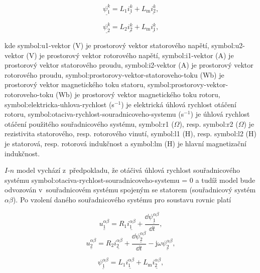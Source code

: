 \documentclass[a4paper, twoside, 11pt]{article}
\begin{document}
		\begin{equation}
			\underline{\psi_1^{k}} = L_1 \underline{i_1^{k}} + L_\text{m} \underline{i_2^{k}},
		\end{equation}
	
		\begin{equation}
			\underline{\psi_2^{k}} = L_2 \underline{i_2^{k}} + L_\text{m} \underline{i_1^{k}},
		\end{equation}

		kde \gls{symbol:u1-vektor} (V) je prostorový vektor statorového napětí, \gls{symbol:u2-vektor} (V) je prostorový vektor rotorového napětí, \gls{symbol:i1-vektor} (A) je prostorový vektor statorového proudu, \gls{symbol:i2-vektor} (A) je prostorový vektor rotorového proudu, \gls{symbol:prostorovy-vektor-statoroveho-toku} (Wb) je prostorový vektor magnetického toku statoru, \gls{symbol:prostorovy-vektor-rotoroveho-toku} (Wb) je prostorový vektor magnetického toku rotoru, \gls{symbol:elektricka-uhlova-rychlost} (s$^{-1}$) je elektrická úhlová rychlost otáčení rotoru, \gls{symbol:otaciva-rychlost-souradnicoveho-systemu} (s$^{-1}$) je úhlová rychlost otáčení použitého souřadnicového systému, \gls{symbol:r1} ($\Omega$), resp. \gls{symbol:r2} ($\Omega$) je rezistivita statorového, resp. rotorového vinutí, \gls{symbol:l1} (H), resp. \gls{symbol:l2} (H) je statorová, resp. rotorová indukčnost a \gls{symbol:lm} (H) je hlavní magnetizační indukčnost.\par
		$I$-$n$ model vychází z~předpokladu, že otáčivá úhlová rychlost souřadnicového systému \gls{symbol:otaciva-rychlost-souradnicoveho-systemu} = 0 a tudíž model bude odvozován v~souřadnicovém systému spojeným se statorem (souřadnicový systém $\alpha \beta$). Po vzolení daného souřadnicového systému pro soustavu rovnic platí

		\begin{equation}
			\underline{u_{1}^{\alpha \beta}} = R_1 \underline{i_{1}^{\alpha \beta}} + \frac{\dd{\underline{\psi_1^{\alpha \beta}}}}{\dd{t}},
		\end{equation}
		\begin{equation}\label{eq:alphabeta-napeti-rotor-rovnice-i-n-model}
			\underline{u_{2}^{\alpha \beta}} = R_2 \underline{i_{2}^{\alpha \beta}} + \frac{\dd{\underline{\psi_2^{\alpha \beta}}}}{\dd{t}} - \text{j} \omega \underline{\psi_2^{\alpha \beta}},
		\end{equation}
	
		\begin{equation}
			\underline{\psi_1^{\alpha \beta}} = L_1 \underline{i_1^{\alpha \beta}} + L_\text{m} \underline{i_2^{\alpha \beta}},
		\end{equation}
	
\end{document}
